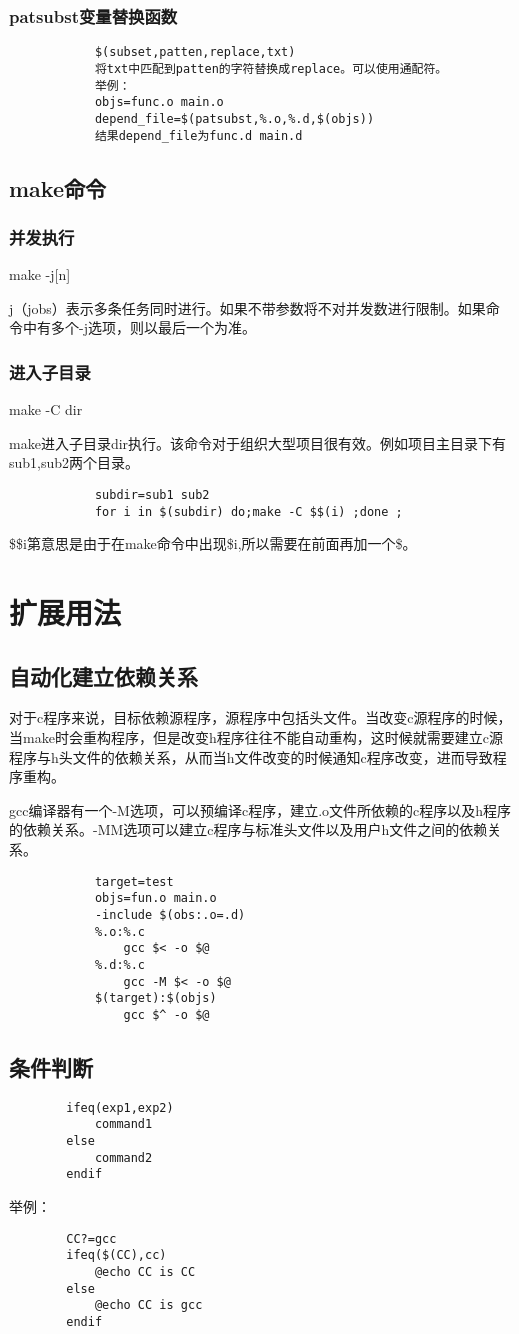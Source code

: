 \documentclass{article}
\begin{document}
\begin{CJK}{UTF8}{gbsn}
		\subsubsection{patsubst变量替换函数}
		\begin{verbatim}
			$(subset,patten,replace,txt)
			将txt中匹配到patten的字符替换成replace。可以使用通配符。
			举例：
			objs=func.o main.o
			depend_file=$(patsubst,%.o,%.d,$(objs))
			结果depend_file为func.d main.d
		\end{verbatim}

	\subsection{make命令}
	\subsubsection{并发执行}
		make -j[n]\par
		j（jobs）表示多条任务同时进行。如果不带参数将不对并发数进行限制。如果命令中有多个-j选项，则以最后一个为准。
	\subsubsection{进入子目录}
		make -C  dir\par
		make进入子目录dir执行。该命令对于组织大型项目很有效。例如项目主目录下有sub1,sub2两个目录。\par
		\begin{verbatim}
			subdir=sub1 sub2
			for i in $(subdir) do;make -C $$(i) ;done ;
		\end{verbatim}\par
		\$\$i第意思是由于在make命令中出现\$i,所以需要在前面再加一个\$。	
	\section{扩展用法}
	\subsection{自动化建立依赖关系}
		对于c程序来说，目标依赖源程序，源程序中包括头文件。当改变c源程序的时候，当make时会重构程序，但是改变h程序往往不能自动重构，这时候就需要建立c源程序与h头文件的依赖关系，从而当h文件改变的时候通知c程序改变，进而导致程序重构。
		\par
		gcc编译器有一个-M选项，可以预编译c程序，建立.o文件所依赖的c程序以及h程序的依赖关系。-MM选项可以建立c程序与标准头文件以及用户h文件之间的依赖关系。
		\begin{verbatim}
			target=test
			objs=fun.o main.o
			-include $(obs:.o=.d)
			%.o:%.c
			    gcc $< -o $@
			%.d:%.c
			    gcc -M $< -o $@
			$(target):$(objs)
			    gcc $^ -o $@
		\end{verbatim}

	\subsection{条件判断}
	\begin{verbatim}
		ifeq(exp1,exp2)
		    command1
		else
		    command2
		endif
	\end{verbatim}
	举例：
	\begin{verbatim}
		CC?=gcc
		ifeq($(CC),cc)
		    @echo CC is CC
		else
		    @echo CC is gcc
		endif
	\end{verbatim}
\end{CJK}
\end{document}
